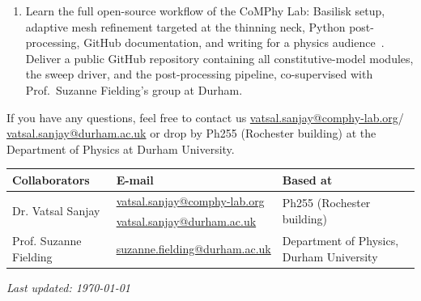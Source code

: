 \documentclass[11pt]{article}
\begin{document}
\begin{enumerate}
\item Learn the full open-source workflow of the CoMPhy Lab: Basilisk setup, adaptive mesh refinement targeted at the thinning neck, Python post-processing, GitHub documentation, and writing for a physics audience~\citep{popinet2015quadtree,basiliskVatsal}. Deliver a public GitHub repository containing all constitutive-model modules, the sweep driver, and the post-processing pipeline, co-supervised with Prof.\ Suzanne Fielding's group at Durham.
\end{enumerate}

If you have any questions, feel free to contact us \href{mailto:vatsal.sanjay@comphy-lab.org}{vatsal.sanjay@comphy-lab.org}/\\\href{mailto:vatsal.sanjay@durham.ac.uk}{vatsal.sanjay@durham.ac.uk} or drop by Ph255 (Rochester building) at the Department of Physics at Durham University.

\begin{center}
\begin{tabular}{|l|l|l|}
\hline \textbf{Collaborators} & \textbf{E-mail} & \textbf{Based at} \\
\hline \multirow{2}{*}{Dr. Vatsal Sanjay} & \href{mailto:vatsal.sanjay@comphy-lab.org}{vatsal.sanjay@comphy-lab.org} & \multirow{2}{*}{Ph255 (Rochester building)} \\
& \href{mailto:vatsal.sanjay@durham.ac.uk}{vatsal.sanjay@durham.ac.uk} & \\
\hline Prof. Suzanne Fielding & \href{mailto:suzanne.fielding@durham.ac.uk}{suzanne.fielding@durham.ac.uk} & Department of Physics, Durham University \\
\hline
\end{tabular}
\end{center}

\vspace{1em}
\noindent\textit{Last updated: \today}

\printbibliography
\end{document}
